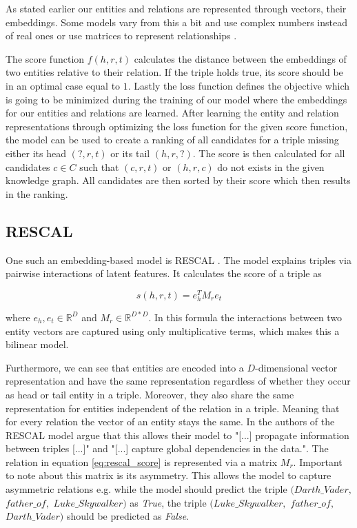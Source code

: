 As stated earlier our entities and relations are represented through vectors, their embeddings. Some models vary from this a bit and use complex numbers instead of real ones \cite{trouillon_complex_2016}  or use matrices to represent relationships \cite{nickel_three-way_2011}.

The score function $f(h,r,t)$ calculates the distance between the embeddings of two entities relative to their relation. If the triple holds true, its score should be in an optimal case equal to $1$. 
Lastly the loss function defines the objective which is going to be minimized during the training of our model where the embeddings for our entities and relations are learned. 
After learning the entity and relation representations through optimizing the loss function for the given score function, the model can be used to create a ranking of all candidates for a triple missing either its head $(?,r,t)$ or its tail $(h,r,?)$. The score is then calculated for all candidates $c \in C$ such that $(c,r,t)$ or $(h,r,c)$ do not exists in the given knowledge graph. All candidates are then sorted by their score which then results in the ranking. 

\subsection{RESCAL}
\label{cha:rescal}
One such an embedding-based model is RESCAL \cite{nickel_three-way_2011}\cite{nickel_factorizing_2012}. The model explains triples via pairwise interactions of latent features. It calculates the score of a triple as

\begin{equation}
\label{eq:rescal_score}
s(h,r,t)=e_h^T M_r e_t
\end{equation}

where $e_h, e_t \in \mathbb{R}^D$ and $M_r \in \mathbb{R}^{D*D}$. In this formula the interactions between two entity vectors are captured using only multiplicative terms, which makes this a bilinear model.

Furthermore, we can see that entities are encoded into a $D$-dimensional vector representation and have the same representation regardless of whether they occur as head or tail entity in a triple. Moreover, they also share the same representation for entities independent of the relation in a triple. Meaning that for every relation the vector of an entity stays the same. In \cite{nickel_review_2015} the authors of the RESCAL model argue that this allows their model to "[...] propagate information between triples [...]" and "[...] capture global dependencies in the data.". The relation in equation \ref{eq:rescal_score} is represented via a matrix $M_r$. Important to note about this matrix is its asymmetry. This allows the model to capture asymmetric relations e.g. while the model should predict the triple $(Darth\_Vader,$ $ father\_of,$ $Luke\_Skywalker)$ as \textit{True}, the triple $(Luke\_Skywalker,$ $ father\_of,$ $ Darth\_Vader)$ should be predicted as \textit{False}. 

